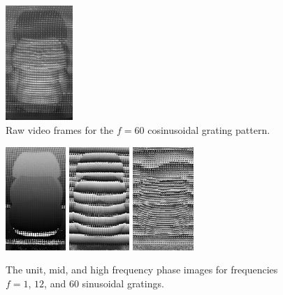 \documentclass[10pt]{article}
\begin{document}
\begin{figure}[!t]
	\centering\includegraphics[width=1.0in]{Figures/Pab03}
	\caption{Raw video frames for the $f=60$ cosinusoidal grating pattern.}
	\label{Pab03}
\end{figure}


\begin{figure}[!t]
	\centering\includegraphics[width=0.90in]{Figures/Pab02} \hspace{0.05in}
	\centering\includegraphics[width=0.90in]{Figures/Pab01} \hspace{0.05in}
	\centering\includegraphics[width=0.90in]{Figures/Pab00}
	\caption{The unit, mid, and high frequency phase images for frequencies $f=1$, $12$, and $60$ sinusoidal gratings.}
	\label{figpah3}
\end{figure}
\end{document}
